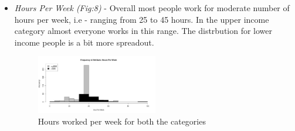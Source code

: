 \begin{itemize}
\begin{figure}[h]
		\end{figure}
	\item \emph{Hours Per Week (Fig:8)} - Overall most people work for moderate number of hours per week,  i.e - ranging from 25 to 45 hours. In the upper income category almost everyone works in this range. The distrbution for lower income people is a bit more spreadout.
		 \begin{figure}[h]
			\label{fig:hour-per-week-hist}
			\caption{Hours worked per week for both the categories}
			\centering
			\includegraphics[width=0.5\textwidth]{images/hours-hist.jpg}
		\end{figure}
\end{itemize}
